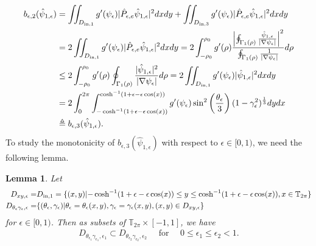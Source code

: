 \documentclass[1 [leqno, 11pt]{amsart}
\numberwithin{equation}{section}
\let\ep=\epsilon
\newtheorem{lemma}[Theorem]{Lemma}
\begin{document}
\begin{CJK*}{GBK}{song}
\begin{align}
b_{\ep, 2}(\hat{\psi}_{1,\ep})
& = \iint_{D_{\rm{in},1}} g'(\psi_\ep) |\hat{P}_{\ep,e} \hat{\psi}_{1,\ep}|^2 dxdy + \iint_{D_{\rm{in},3}} g'(\psi_\ep) |\hat{P}_{\ep,e} \hat{\psi}_{1,\ep}|^2 dxdy\\\nonumber
&=2\iint_{D_{\rm{in},1}} g'(\psi_\ep) |\hat{P}_{\ep,e} \hat{\psi}_{1,\ep}|^2 dxdy
=2\int_{-\rho_0}^{\rho_0} g'(\rho)  \frac{\left|\oint_{\Gamma_1 (\rho)} \frac{\hat{\psi}_{1,\ep}}{|\nabla \psi_\ep|}\right|^2}{\oint_{\Gamma_1 (\rho)} \frac{1}{|\nabla\psi_\ep|}} d\rho\\\nonumber
&\leq2\int_{-\rho_0}^{\rho_0} g'(\rho) \oint_{\Gamma_1 (\rho)} \frac{|\hat{\psi}_{1,\ep}|^2}{|\nabla \psi_\ep|}d\rho=2 \iint_{D_{\rm{in},1}} g'(\psi_\ep) | \hat{\psi}_{1,\ep}|^2 dxdy\\\nonumber
&=2\int_0^{2\pi}\int_{-\cosh^{-1}(1+\ep-\ep\cos(x))}^{\cosh^{-1}(1+\ep-\ep\cos(x))}g'(\psi_\ep)
\sin^2\left(\frac{\theta_\ep}{3}\right)(1-\gamma_\ep^2)^{1\over3}dydx\\\label{b-ep-2-hat-psi-1-ep}
&\triangleq b_{\ep,3}(\hat{\psi}_{1,\ep}).
\end{align}
To study the monotonicity of $ b_{\ep,3}(\hat{\psi}_{1,\ep})$ with respect to $\ep\in[0,1)$, we need the following lemma.
\begin{lemma}\label{D-theta-gamma-ep-nest}
Let
\begin{align*}
D_{xy,\ep}=&D_{\rm{in},1}=\{(x,y)|{-\cosh^{-1}(1+\ep-\ep\cos(x))}\leq y\leq {\cosh^{-1}(1+\ep-\ep\cos(x))}, x\in\mathbb{T}_{2\pi}\}\\
D_{\theta_\ep\gamma_\ep,\ep}=&\{(\theta_\ep,\gamma_{\ep})|\theta_\ep=\theta_\ep(x,y),\gamma_{\ep}=\gamma_{\ep}(x,y),(x,y)\in D_{xy,\ep}\}
\end{align*}
for $\ep\in[0,1)$. Then as subsets of $\mathbb{T}_{2\pi}\times[-1,1]$, we have
 \begin{align}\label{D1D2-constant}
 D_{\theta_{\ep_1}\gamma_{\ep_1},\ep_1}\subset D_{\theta_{\ep_2}\gamma_{\ep_2},\ep_2} \quad\text{ for }\quad0\leq \ep_1\leq \ep_2<1.
 \end{align}
\end{lemma}


\end{CJK*}
\end{document}

